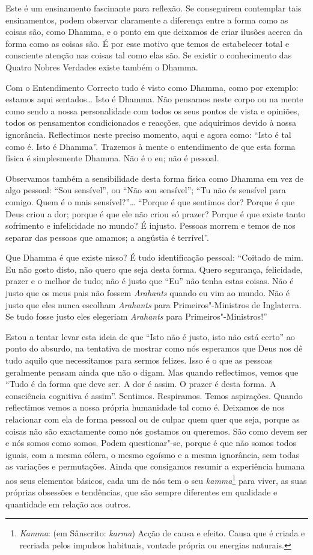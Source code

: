 Este é um ensinamento fascinante para reflexão.
Se conseguirem contemplar tais ensinamentos, podem observar claramente a
diferença entre a forma como as coisas são, como Dhamma, e o ponto em que
deixamos de criar ilusões acerca da forma como as coisas são. É por esse motivo
que temos de estabelecer total e consciente atenção nas coisas tal como elas
são. Se existir o conhecimento das Quatro Nobres Verdades existe também o
Dhamma.

Com o Entendimento Correcto tudo é visto como Dhamma, como por exemplo: estamos
aqui sentados\ldots{} Isto é Dhamma. Não pensamos neste corpo ou na mente como
sendo a nossa personalidade com todos os seus pontos de vista e opiniões, todos
os pensamentos condicionados e reacções, que adquirimos devido à nossa
ignorância. Reflectimos neste preciso momento, aqui e agora como: “Isto é tal
como é. Isto é Dhamma”. Trazemos à mente o entendimento de que esta forma física
é simplesmente Dhamma. Não é o eu; não é pessoal.

Observamos também a sensibilidade desta forma física como Dhamma em vez de algo
pessoal: “Sou sensível”, ou “Não sou sensível”; “Tu não és sensível para comigo.
Quem é o mais sensível?”\ldots{} “Porque é que sentimos dor? Porque é que Deus
criou a dor; porque é que ele não criou só prazer? Porque é que existe tanto
sofrimento e infelicidade no mundo? É injusto. Pessoas morrem e temos de nos
separar das pessoas que amamos; a angústia é terrível”.

Que Dhamma é que existe nisso? É tudo identificação pessoal: “Coitado de mim. Eu
não gosto disto, não quero que seja desta forma. Quero segurança, felicidade,
prazer e o melhor de tudo; não é justo que “Eu” não tenha estas coisas. Não é
justo que os meus pais não fossem \emph{Arahants} quando eu vim ao mundo. Não é
justo que eles nunca escolham \emph{Arahants} para Primeiros"-Ministros de
Inglaterra. Se tudo fosse justo eles elegeriam \emph{Arahants} para
Primeiros"-Ministros!”

Estou a tentar levar esta ideia de que “Isto não é justo, isto não está certo”
ao ponto do absurdo, na tentativa de mostrar como nós esperamos que Deus nos dê
tudo aquilo que necessitamos para sermos felizes. Isso é o que as pessoas
geralmente pensam ainda que não o digam. Mas quando reflectimos, vemos que “Tudo
é da forma que deve ser. A dor é assim. O prazer é desta forma. A consciência cognitiva 
é assim”. Sentimos. Respiramos. Temos aspirações. Quando reflectimos vemos a nossa
própria humanidade tal como é. Deixamos de nos relacionar com ela de forma
pessoal ou de culpar quem quer que seja, porque as coisas não são exactamente
como nós gostamos ou queremos. São como devem ser e nós somos como somos. Podem
questionar"-se, porque é que não somos todos iguais, com a mesma cólera, o mesmo
egoísmo e a mesma ignorância, sem todas as variações e permutações. Ainda que
consigamos resumir a experiência humana aos seus elementos básicos, cada um de
nós tem o seu \emph{kamma}\footnote{%
  \emph{Kamma}: (em Sânscrito: \emph{karma}) Acção de causa e efeito. Causa que
  é criada e recriada pelos impulsos habituais, vontade própria ou energias
  naturais.} para viver, as suas próprias obsessões e tendências, que são sempre
diferentes em qualidade e quantidade em relação aos outros.

